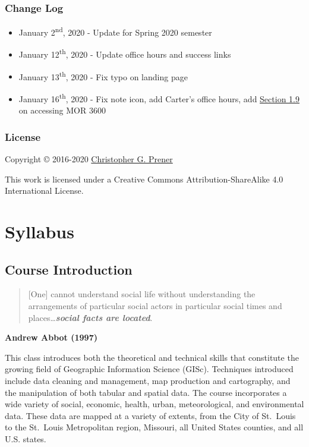 \documentclass[]{book}
\providecommand{\tightlist}{%
  \setlength{\itemsep}{0pt}\setlength{\parskip}{0pt}}
\begin{document}
\hypertarget{change-log}{%
\section*{Change Log}\label{change-log}}

\begin{itemize}
\tightlist
\item
  January 2\textsuperscript{nd}, 2020 - Update for Spring 2020 semester
\item
  January 12\textsuperscript{th}, 2020 - Update office hours and success links
\item
  January 13\textsuperscript{th}, 2020 - Fix typo on landing page
\item
  January 16\textsuperscript{th}, 2020 - Fix note icon, add Carter's office hours, add \href{/lab-access.html}{Section 1.9} on accessing MOR 3600
\end{itemize}

\hypertarget{license}{%
\section*{License}\label{license}}

Copyright © 2016-2020 \href{https://chris-prener.github.io}{Christopher G. Prener}

This work is licensed under a Creative Commons Attribution-ShareAlike 4.0 International License.

\hypertarget{part-syllabus}{%
\part{Syllabus}\label{part-syllabus}}

\hypertarget{course-introduction}{%
\chapter{Course Introduction}\label{course-introduction}}

\begin{quote}
{[}One{]} cannot understand social life without understanding the arrangements of particular social actors in particular social times and places\ldots{}\textbf{\emph{social facts are located}}.
\end{quote}

\textbf{Andrew Abbot (1997)}

This class introduces both the theoretical and technical skills that constitute the growing field of Geographic Information Science (GISc). Techniques introduced include data cleaning and management, map production and cartography, and the manipulation of both tabular and spatial data. The course incorporates a wide variety of social, economic, health, urban, meteorological, and environmental data. These data are mapped at a variety of extents, from the City of St.~Louis to the St.~Louis Metropolitan region, Missouri, all United States counties, and all U.S. states.
\end{document}
